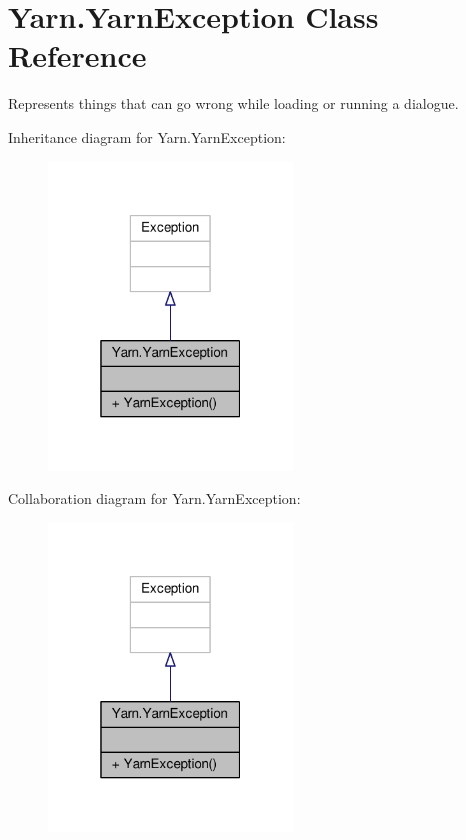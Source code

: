 \hypertarget{a00188}{\section{Yarn.\-Yarn\-Exception Class Reference}
\label{a00188}
}


Represents things that can go wrong while loading or running a dialogue.  




Inheritance diagram for Yarn.\-Yarn\-Exception\-:
\nopagebreak
\begin{figure}[H]
\begin{center}
\leavevmode
\includegraphics[width=184pt]{a00592}
\end{center}
\end{figure}


Collaboration diagram for Yarn.\-Yarn\-Exception\-:
\nopagebreak
\begin{figure}[H]
\begin{center}
\leavevmode
\includegraphics[width=184pt]{a00593}
\end{center}
\end{figure}
